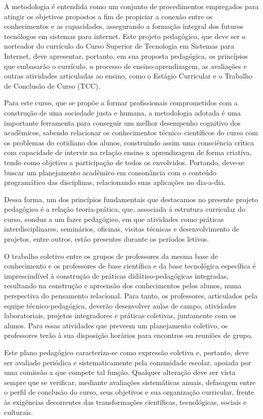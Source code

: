 A metodologia é entendida como um conjunto de procedimentos empregados para atingir os objetivos propostos a fim de propiciar a conexão entre os conhecimentos e as capacidades, assegurando a formação integral dos futuros tecnólogos em sistemas para internet. Este projeto pedagógico, que deve ser o norteador do currículo do Curso Superior de Tecnologia em Sistemas para Internet, deve apresentar, portanto, em sua proposta pedagógica, os princípios que embasarão o currículo, o processo de ensino-aprendizagem, as avaliações e outras atividades articuladas ao ensino, como o Estágio Curricular e o Trabalho de Conclusão de Curso (TCC).

Para este curso, que se propõe a formar profissionais comprometidos com a construção de uma sociedade justa e humana, a metodologia adotada é uma importante ferramenta para conseguir um melhor desempenho cognitivo dos acadêmicos, sabendo relacionar os conhecimentos técnico–científicos do curso com os problemas do cotidiano dos alunos, construindo assim uma consciência crítica com capacidade de intervir na relação ensino x aprendizagem de forma criativa, tendo como objetivo a participação de todos os envolvidos. Portando, deve-se buscar um planejamento acadêmico em consonância com o conteúdo programático das disciplinas, relacionando suas aplicações no dia-a-dia.

Dessa forma, um dos princípios fundamentais que destacamos no presente projeto pedagógico é a relação teoria-prática, que, associada à estrutura curricular do curso, conduz a um fazer pedagógico, em que atividades como práticas interdisciplinares, seminários, oficinas, visitas técnicas e desenvolvimento de projetos, entre outros, estão presentes durante os períodos letivos.  

O trabalho coletivo entre os grupos de professores da mesma base de conhecimento e os professores de base científica e da base tecnológica específica é imprescindível à construção de práticas didático-pedagógicas integradas, resultando na construção e apreensão dos conhecimentos pelos alunos, numa perspectiva do pensamento relacional. Para tanto, os professores, articulados pela equipe técnico-pedagógica, deverão desenvolver aulas de campo, atividades laboratoriais, projetos integradores e práticas coletivas, juntamente com os alunos. Para essas atividades que preveem um planejamento coletivo, os professores terão à sua disposição horários para encontros ou reuniões de grupo.

Este plano pedagógico caracteriza-se como expressão coletiva e, portanto, deve ser avaliado periódica e sistematicamente pela comunidade escolar, apoiada por uma comissão a que compete tal função. Qualquer alteração deve ser vista sempre que se verificar, mediante avaliações sistemáticas anuais, defasagem entre o perfil de conclusão do curso, seus objetivos e sua organização curricular, frente às exigências decorrentes das transformações científicas, tecnológicas, sociais e culturais.

